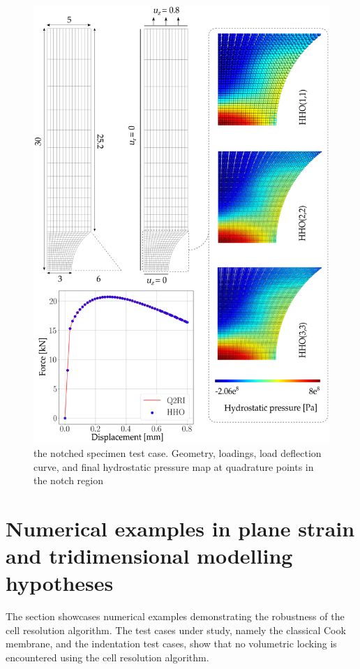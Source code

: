 \begin{figure}[H]
    \centering
    \includegraphics[width=12.cm]{img_calcs/ssna_mesh.png}
    \caption{
        the notched specimen test case. Geometry, loadings, load deflection curve, and final hydrostatic pressure map at quadrature points in the notch region
    }
    \label{fig_ssnaallmesh}
\end{figure}

\section{Numerical examples in plane strain and tridimensional modelling hypotheses}
\label{sec_num_example_part_2}

The section showcases numerical examples demonstrating the robustness
of the cell resolution algorithm. The test cases under study, namely the
classical Cook membrane, and the indentation test cases, show that no
volumetric locking is encountered using the cell resolution algorithm.

